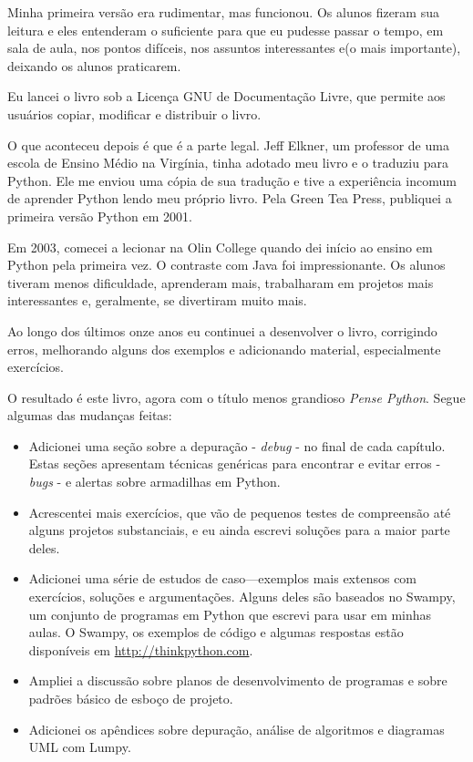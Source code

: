 \documentclass[10pt]{book}
\begin{document}
Minha primeira versão era rudimentar, mas funcionou. Os alunos fizeram sua leitura
e eles entenderam o suficiente para que eu pudesse passar o tempo, em sala de aula, nos
pontos difíceis, nos assuntos interessantes e(o mais importante), deixando
os alunos praticarem.

Eu lancei o livro sob a Licença GNU de Documentação Livre,
que permite aos usuários copiar, modificar e distribuir o livro.

O que aconteceu depois é que é a parte legal. Jeff Elkner, um professor de uma escola
de Ensino Médio na Virgínia, tinha adotado meu livro e o traduziu para
Python. Ele me enviou uma cópia de sua tradução e tive a
experiência incomum de aprender Python lendo meu próprio livro.
Pela Green Tea Press, publiquei a primeira versão Python em 2001.

Em 2003, comecei a lecionar na Olin College quando dei início ao ensino em
Python pela primeira vez. O contraste com Java foi impressionante.
Os alunos tiveram menos dificuldade, aprenderam mais, trabalharam em projetos
mais interessantes e, geralmente, se divertiram muito mais.

Ao longo dos últimos onze anos eu continuei a desenvolver o livro,
corrigindo erros, melhorando alguns dos exemplos e
adicionando material, especialmente exercícios.

O resultado é este livro, agora com o título menos grandioso
{\em Pense Python}. Segue algumas das mudanças feitas:

\begin{itemize}

\item Adicionei uma seção sobre a depuração - {\em debug} - no final de cada capítulo.
  Estas seções apresentam técnicas genéricas para encontrar e evitar
  erros - {\em bugs} -  e alertas sobre armadilhas em Python.

\item Acrescentei mais exercícios, que vão de pequenos testes de
  compreensão até alguns projetos substanciais, e eu ainda escrevi
  soluções para a maior parte deles.

\item Adicionei uma série de estudos de caso---exemplos mais extensos com
exercícios, soluções e argumentações. Alguns deles são baseados no
Swampy, um conjunto de programas em Python que escrevi para usar em minhas aulas.
O Swampy, os exemplos de código e algumas respostas estão disponíveis em
\url{http://thinkpython.com}.

\item Ampliei a discussão sobre planos de desenvolvimento de programas
 e sobre padrões básico de esboço de projeto.

\item Adicionei os apêndices sobre depuração, análise de algoritmos e diagramas
UML com Lumpy.

\end{itemize}
\end{document}

